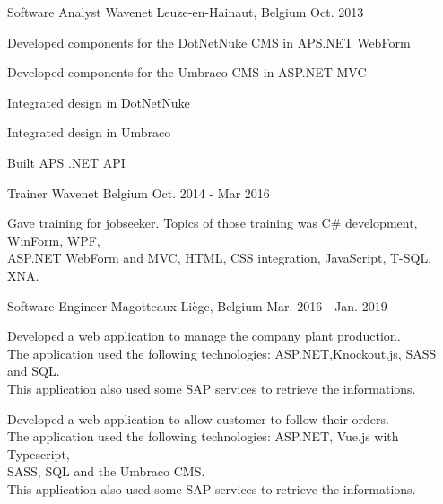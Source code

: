 

\begin{cventries}

  \cventry
    {Software Analyst}
    {Wavenet}
    {Leuze-en-Hainaut, Belgium}
    {Oct. 2013}
    {
      \begin{cvitems}
        \item Developed components for the DotNetNuke CMS in APS.NET WebForm
        \item Developed components for the Umbraco CMS in ASP.NET MVC
        \item Integrated design in DotNetNuke
        \item Integrated design in Umbraco
        \item Built APS .NET API 
      \end{cvitems}
    }

  \cventry
    {Trainer}
    {Wavenet}
    {Belgium}
    {Oct. 2014 - Mar 2016}
    {
      \begin{cvitems}
        \item Gave training for jobseeker. Topics of those training was C\# development, WinForm, WPF,\\ASP.NET WebForm and MVC, HTML, CSS integration, JavaScript, T-SQL, XNA.
      \end{cvitems}
    }

  \cventry
      {Software Engineer}
      {Magotteaux}
      {Liège, Belgium}
      {Mar. 2016 - Jan. 2019}
      {
        \begin{cvitems}
          \item Developed a web application to manage the company plant production.\\The application used the following technologies: ASP.NET,Knockout.js, SASS and SQL.\\This application also used some SAP services to retrieve the informations.
          \item Developed a web application to allow customer to follow their orders.\\The application used the following technologies: ASP.NET, Vue.js with Typescript,\\SASS, SQL and the Umbraco CMS.\\This application also used some SAP services to retrieve the informations.
        \end{cvitems}
      }


\end{cventries}
